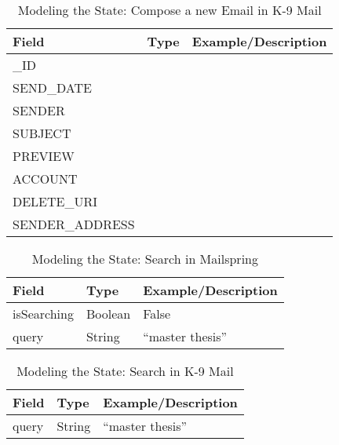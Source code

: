 \newpage
\begin{table}[ht!]
\begin{tabular}{lll}
Field     & Type      & Example/Description \\
\hline
\_ID            &  &  \\
SEND\_DATE      &      &                     \\
SENDER         &      &                     \\
SUBJECT        &      &                     \\
PREVIEW        &      &                     \\
ACCOUNT        &      &                     \\
DELETE\_URI     &      &                     \\
SENDER\_ADDRESS &      &                    
\end{tabular}
\caption{Modeling the State: Compose a new Email in K-9 Mail}
\label{tab:compose_new_email_k9}
\end{table}


\begin{table}[ht!]
\begin{tabular}{lll}
Field       & Type    & Example/Description \\
\hline
isSearching & Boolean & False               \\
query       & String  & “master   thesis”  
\end{tabular}
\caption{Modeling the State: Search in Mailspring}
\label{tab:search_mailspring}
\end{table}


\begin{table}[ht!]
\begin{tabular}{lll}
Field & Type   & Example/Description \\
\hline
query & String & “master thesis”    
\end{tabular}
\caption{Modeling the State: Search in K-9 Mail}
\label{tab:search-k9}
\end{table}

